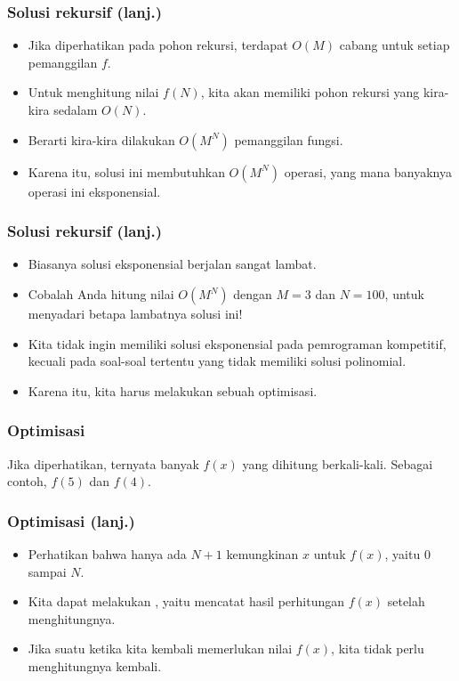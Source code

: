 \begin{frame}
\frametitle{Solusi rekursif (lanj.)}
\begin{itemize}
  \item Jika diperhatikan pada pohon rekursi, terdapat $O(M)$ cabang untuk setiap pemanggilan $f$.
  \item Untuk menghitung nilai $f(N)$, kita akan memiliki pohon rekursi yang kira-kira sedalam $O(N)$.
  \item Berarti kira-kira dilakukan $O(M^N)$ pemanggilan fungsi.
  \item Karena itu, solusi ini membutuhkan $O(M^N)$ operasi, yang mana banyaknya operasi ini eksponensial.
\end{itemize}
\end{frame}

\begin{frame}
\frametitle{Solusi rekursif (lanj.)}
\begin{itemize}
  \item Biasanya solusi eksponensial berjalan sangat lambat.
  \item Cobalah Anda hitung nilai $O(M^N)$ dengan $M=3$ dan $N=100$, untuk menyadari betapa lambatnya solusi ini!
  \item Kita tidak ingin memiliki solusi eksponensial pada pemrograman kompetitif, kecuali pada soal-soal tertentu  yang tidak memiliki solusi polinomial. 
  \item Karena itu, kita harus melakukan sebuah optimisasi.
\end{itemize}
\end{frame}

\begin{frame}
\frametitle{Optimisasi}
Jika diperhatikan, ternyata banyak $f(x)$ yang dihitung berkali-kali. Sebagai contoh, $f(5)$ dan $f(4)$.
\begin{center}
\scalebox{0.8}{
\Tree [.$f(12)$
  [.$f(2)$
    [.$f(1)$
      [.$f(0)$ ]
    ]
  ]
  [.$f(6)$
    [.$f(0)$ ]
    [.$f(5)$
      [.$f(4)$
        [.$...$
        ]
      ]
    ]
  ]
  [.$f(11)$
    [.$f(1)$
      [.$f(0)$ ]
    ]
    [.$f(5)$
      [.$f(4)$
        [.$...$          
        ]
      ]
    ]
    [.$f(10)$ 
      [.$f(0)$ 
        [.$...$ ]      
      ]
      [.$f(4)$ 
        [.$...$ ]      
      ]
      [.$f(9)$ 
        [.$...$ ]      
      ]
    ]
  ]
]
}
\end{center}
\end{frame}

\begin{frame}
\frametitle{Optimisasi (lanj.)}
\begin{itemize}
  \item Perhatikan bahwa hanya ada $N + 1$ kemungkinan $x$ untuk $f(x)$, yaitu $0$ sampai $N$.
  
  \item Kita dapat melakukan , yaitu mencatat hasil perhitungan $f(x)$ setelah menghitungnya.
  \item Jika suatu ketika kita kembali memerlukan nilai $f(x)$, kita tidak perlu menghitungnya kembali.
\end{itemize}
\end{frame}

